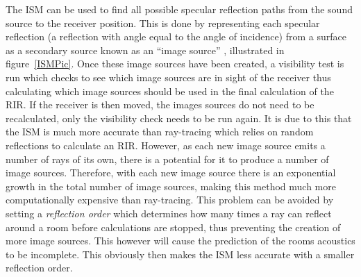 \documentclass[../../main.tex]{subfiles}
\begin{document}
			The \ac{ISM} can be used to find all possible specular reflection paths from the sound source to the receiver position. This is done by representing each specular reflection (a reflection with angle equal to the angle of incidence) from a surface as a secondary source known as an ``image source'' \cite{Rindel1995}, illustrated in figure~\ref{ISMPic}. Once these image sources have been created, a visibility test is run which checks to see which image sources are in sight of the receiver thus calculating which image sources should be used in the final calculation of the \ac{RIR}. If the receiver is then moved, the images sources do not need to be recalculated, only the visibility check needs to be run again. It is due to this that the \ac{ISM} is much more accurate than ray-tracing which relies on random reflections to calculate an \ac{RIR}. However, as each new image source emits a number of rays of its own, there is a potential for it to produce a number of image sources. Therefore, with each new image source there is an exponential growth in the total number of image sources, making this method much more computationally expensive than ray-tracing. This problem can be avoided by setting a \textit{reflection order} which determines how many times a ray can reflect around a room before calculations are stopped, thus preventing the creation of more image sources. This however will cause the prediction of the rooms acoustics to be incomplete. This obviously then makes the \ac{ISM} less accurate with a smaller reflection order.

\end{document}
